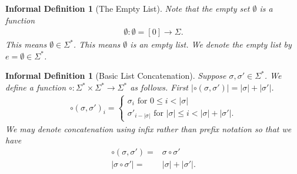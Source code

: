 \documentclass[12pt]{article}
\theoremstyle{break}
\theoremstyle{break}
\theoremstyle{break}
\theoremstyle{break}
\theoremstyle{break}
\newtheorem{informal definition}[definition]{Informal Definition}
\theoremstyle{break}
\newtheorem{informal theorem}[theorem]{Informal Theorem}
\begin{document}
	\begin{informal definition}[The Empty List]
		Note that the empty set $\emptyset$ is a function
		\begin{align*}
			\emptyset: \emptyset = [0] \to \Sigma.
		\end{align*}
		This means $\emptyset \in \Sigma^*$.
		This means $\emptyset$ is an empty list. 
		We denote the empty list by $e = \emptyset \in \Sigma^*$.
	\end{informal definition}
	
	
	\begin{informal definition}[Basic List Concatenation]
		Suppose $\sigma, \sigma' \in \Sigma^*$.
		We define a function $\circ: \Sigma^* \times \Sigma^* \to \Sigma^*$ as follows.
		First $|\circ(\sigma, \sigma')| = |\sigma| + |\sigma'|$.
		\begin{align*}
			\circ(\sigma, \sigma')_i = \begin{cases}
				\sigma_i \text{ for } 0 \le i < |\sigma|\\
				\sigma'_{i-|\sigma|} \text{ for } |\sigma| \le i < |\sigma| + |\sigma'|.
			\end{cases}
		\end{align*}
		We may denote concatenation using infix rather than prefix notation so that we have
		\begin{align*}
			\circ(\sigma, \sigma') =& \sigma \circ \sigma'\\
			|\sigma \circ \sigma'| =& |\sigma| + |\sigma'|.
		\end{align*}
	\end{informal definition}
	
\end{document}

